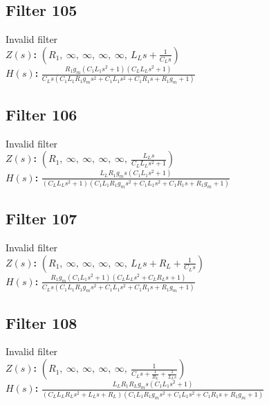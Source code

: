 \documentclass{article}
\begin{document}
\subsection*{Filter 105}
Invalid filter \\ 
\textbf{$Z(s)$:} $\left( R_{1}, \  \infty, \  \infty, \  \infty, \  \infty, \  L_{L} s + \frac{1}{C_{L} s}\right)$ \\ 
\textbf{$H(s)$:} $\frac{R_{1} g_{m} \left(C_{1} L_{1} s^{2} + 1\right) \left(C_{L} L_{L} s^{2} + 1\right)}{C_{L} s \left(C_{1} L_{1} R_{1} g_{m} s^{2} + C_{1} L_{1} s^{2} + C_{1} R_{1} s + R_{1} g_{m} + 1\right)}$ \\ 
\subsection*{Filter 106}
Invalid filter \\ 
\textbf{$Z(s)$:} $\left( R_{1}, \  \infty, \  \infty, \  \infty, \  \infty, \  \frac{L_{L} s}{C_{L} L_{L} s^{2} + 1}\right)$ \\ 
\textbf{$H(s)$:} $\frac{L_{L} R_{1} g_{m} s \left(C_{1} L_{1} s^{2} + 1\right)}{\left(C_{L} L_{L} s^{2} + 1\right) \left(C_{1} L_{1} R_{1} g_{m} s^{2} + C_{1} L_{1} s^{2} + C_{1} R_{1} s + R_{1} g_{m} + 1\right)}$ \\ 
\subsection*{Filter 107}
Invalid filter \\ 
\textbf{$Z(s)$:} $\left( R_{1}, \  \infty, \  \infty, \  \infty, \  \infty, \  L_{L} s + R_{L} + \frac{1}{C_{L} s}\right)$ \\ 
\textbf{$H(s)$:} $\frac{R_{1} g_{m} \left(C_{1} L_{1} s^{2} + 1\right) \left(C_{L} L_{L} s^{2} + C_{L} R_{L} s + 1\right)}{C_{L} s \left(C_{1} L_{1} R_{1} g_{m} s^{2} + C_{1} L_{1} s^{2} + C_{1} R_{1} s + R_{1} g_{m} + 1\right)}$ \\ 
\subsection*{Filter 108}
Invalid filter \\ 
\textbf{$Z(s)$:} $\left( R_{1}, \  \infty, \  \infty, \  \infty, \  \infty, \  \frac{1}{C_{L} s + \frac{1}{R_{L}} + \frac{1}{L_{L} s}}\right)$ \\ 
\textbf{$H(s)$:} $\frac{L_{L} R_{1} R_{L} g_{m} s \left(C_{1} L_{1} s^{2} + 1\right)}{\left(C_{L} L_{L} R_{L} s^{2} + L_{L} s + R_{L}\right) \left(C_{1} L_{1} R_{1} g_{m} s^{2} + C_{1} L_{1} s^{2} + C_{1} R_{1} s + R_{1} g_{m} + 1\right)}$ \\ 
\end{document}
